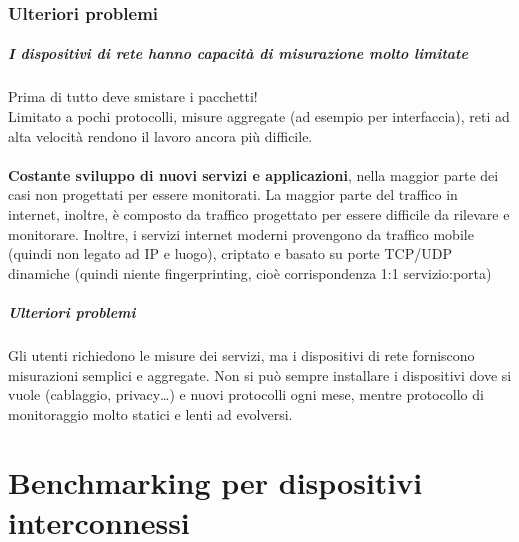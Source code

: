 \documentclass[10pt]{book}
\begin{document}
\subsection{Ulteriori problemi} \paragraph{I dispositivi di rete hanno capacità di misurazione molto limitate} Prima di tutto deve smistare i pacchetti!\\
Limitato a pochi protocolli, misure aggregate (ad esempio per interfaccia), reti ad alta velocità rendono il lavoro ancora più difficile.\\\\
\textbf{Costante sviluppo di nuovi servizi e applicazioni}, nella maggior parte dei casi non progettati per essere monitorati. La maggior parte del traffico in internet, inoltre, è composto da traffico progettato per essere difficile da rilevare e monitorare. Inoltre, i servizi internet moderni provengono da traffico mobile (quindi non legato ad IP e luogo), criptato e basato su porte TCP/UDP dinamiche (quindi niente fingerprinting, cioè corrispondenza 1:1 servizio:porta)
\paragraph{Ulteriori problemi} Gli utenti richiedono le misure dei servizi, ma i dispositivi di rete forniscono misurazioni semplici e aggregate. Non si può sempre installare i dispositivi dove si vuole (cablaggio, privacy\ldots) e nuovi protocolli ogni mese, mentre protocollo di monitoraggio molto statici e lenti ad evolversi.
\chapter{Benchmarking per dispositivi interconnessi}
\end{document}
